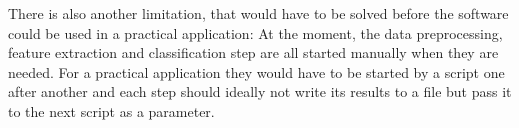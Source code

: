 
There is also another limitation, that would have to be solved before the software could be used in a practical application:
At the moment, the data preprocessing, feature extraction and classification step are all started manually when they are needed.
For a practical application they would have to be started by a script one after another and each step should ideally not write its results to a file but pass it to the next script as a parameter.


